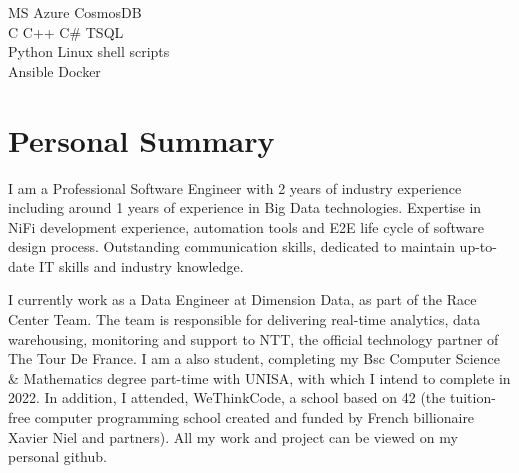 \documentclass[]{deedy-resume-openfont}
\begin{document}
\begin{minipage}[t]{0.33\textwidth}
MS Azure \textbullet{} CosmosDB \\

C \textbullet{} C++ \textbullet{} C\# \textbullet{}  TSQL \\

Python \textbullet{} Linux shell scripts \\


Ansible \textbullet{} Docker \\
\sectionsep



%
%

\end{minipage} 
\hfill
\begin{minipage}[t]{0.66\textwidth} 



\section{Personal Summary}

I am a Professional Software Engineer with 2 years of industry experience including around 1 years of experience in Big Data technologies. Expertise in NiFi development experience, automation tools and E2E life cycle of software design
process. Outstanding communication skills, dedicated to maintain up-to-date IT skills and industry knowledge.
\sectionsep

I currently work as a Data Engineer at Dimension Data, as part of the Race Center Team. The team is
responsible for delivering real-time analytics, data warehousing,  monitoring and support to NTT, the official technology partner of The Tour De France. 
\sectionsep
I am a also student, completing my Bsc Computer Science \& Mathematics degree part-time with UNISA, with which I intend to complete in 2022. In addition, I attended, WeThinkCode, a school based on  42 (the tuition-free computer programming school created and funded by French billionaire Xavier Niel and partners). All my work and project can be viewed on my personal github.  
\sectionsep





\end{minipage}
\end{document}

